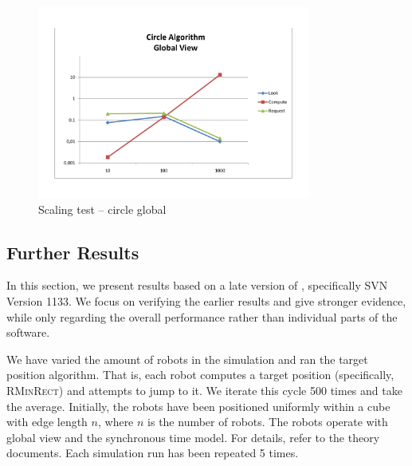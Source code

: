 \begin{figure}[p]
	\begin{center}
	\includegraphics[width=0.8\textwidth]{scaling-circle-global}
	\caption{Scaling test -- circle global}
	\label{pic:scaling:circleglobal}
	\end{center}
\end{figure}

\subsection{Further Results}
In this section, we present results based on a late version of \RSS, specifically SVN Version 1133. We focus on verifying the earlier results and give stronger evidence, while only regarding the overall performance rather than individual parts of the software.

We have varied the amount of robots in the simulation and ran the target position algorithm. That is, each robot computes a target position (specifically, \textsc{RMinRect}) and attempts to jump to it. We iterate this \LCM cycle 500 times and take the average. Initially, the robots have been positioned uniformly within a cube with edge length $n$, where $n$ is the number of robots. The robots operate with global view and the synchronous time model. For details, refer to the theory documents. Each simulation run has been repeated 5 times.

